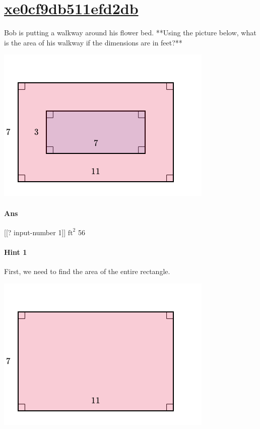 \documentclass[twocolumn,10pt]{article}
\def\shrinkfactor{0.55}
\begin{document}
\section{\href{https://www.khanacademy.org/devadmin/content/items/xe0cf9db511efd2db}{xe0cf9db511efd2db}}

\noindent
Bob is putting a walkway around his flower bed.  **Using the picture below, what is the area of his walkway if the dimensions are in feet?**  


\includegraphics[scale=\shrinkfactor]{figures/a13d425dd99487ca1854c5c51e58b6f1b1af0a8c.png}

\paragraph{Ans}  [[? input-number 1]] $\text{ft}^2$  56

\paragraph{Hint 1}First, we need to find the area of the entire rectangle.  

\includegraphics[scale=\shrinkfactor]{figures/5d506bf976ebd334610ff633206cec181bcb395e.png}  
 
\end{document}
